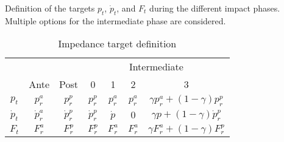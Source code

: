 \documentclass[a4paper, 10pt, conference]{ieeeconf}
\begin{document}
    \begin{table}[h]
    \label{target_defs}
      \caption{Impedance target definition}{Definition of the targets $p_t$, $\dot{p}_t$, and $F_t$ during the different impact phases. Multiple options for the intermediate phase are considered.}

      \centering
    \begin{tabular}{ccc|cccc|}
    \cline{4-7}
                                      &                                    &               & \multicolumn{4}{c|}{Intermediate}                                              \\ \cline{2-7} 
    \multicolumn{1}{c|}{}             & \multicolumn{1}{c|}{Ante}          & Post          & 0             & 1         & 2             & 3                                  \\ \hline
    \multicolumn{1}{|c|}{$p_t$}       & \multicolumn{1}{c|}{$p^a_r$}       & $p^p_r$       & $p^p_r$       & $p^a_r$   & $p^a_r$       & $\gamma p^a_r+(1-\gamma)p^p_r$     \\
    \multicolumn{1}{|c|}{$\dot{p}_t$} & \multicolumn{1}{c|}{$\dot{p}^a_r$} & $\dot{p}^p_r$ & $\dot{p}^p_r$ & $\dot{p}$ & $0$ & $\gamma p + (1-\gamma)\dot{p}^p_r$ \\
    \multicolumn{1}{|c|}{$F_t$}       & \multicolumn{1}{c|}{$F^a_r$}       & $F^p_r$       & $F^p_r$       & $F^a_r$   & $F^a_r$       & $\gamma F^a_r + (1-\gamma)F^p_r$   \\ \hline
    \end{tabular}
    \end{table}

\end{document}
